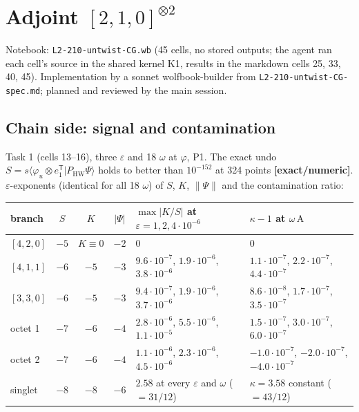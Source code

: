 \documentclass[10pt]{article}
\newcommand{\nb}[1]{\texttt{#1}}
\begin{document}
\section{Adjoint $[2,1,0]^{\otimes2}$}\label{sec:adj}

Notebook: \nb{L2-\allowbreak{}210-\allowbreak{}untwist-\allowbreak{}CG.\allowbreak{}wb} (45 cells, no stored outputs; the agent ran each cell's source in the shared kernel K1, results in the markdown cells 25, 33, 40, 45). Implementation by a sonnet wolfbook-builder from \nb{L2-\allowbreak{}210-\allowbreak{}untwist-\allowbreak{}CG-\allowbreak{}spec.\allowbreak{}md}; planned and reviewed by the main session.

\subsection{Chain side: signal and contamination}\label{sec:adjchain}

Task 1 (cells 13--16), three $\varepsilon$ and 18 $\omega$ at $\varphi$, P1. The exact undo $S=s\langle\varphi_u\otimes e_1^{\mathsf T}|P_{\mathrm{HW}}\Psi\rangle$ holds to better than $10^{-152}$ at 324 points \textbf{[exact/numeric]}. $\varepsilon$-exponents (identical for all 18 $\omega$) of $S$, $K$, $\|\Psi\|$ and the contamination ratio:

\begin{center}\footnotesize\setlength{\tabcolsep}{3pt}\begin{longtable}{@{}p{1.6cm}cccp{4.6cm}p{4.6cm}@{}}\toprule
\textbf{branch} & \textbf{$S$} & \textbf{$K$} & \textbf{$|\Psi|$} & \textbf{$\max\lvert K/S\rvert$ at $\varepsilon=1,2,4\cdot10^{-6}$} & \textbf{$\kappa-1$ at $\omega\,\mathrm{A}$} \\\midrule\endhead
$[4,2,0]$ & $-5$ & $K\equiv0$ & $-2$ & 0 & 0 \\
$[4,1,1]$ & $-6$ & $-5$ & $-3$ & $9.6\cdot10^{-7}$, $1.9\cdot10^{-6}$, $3.8\cdot10^{-6}$ & $1.1\cdot10^{-7}$, $2.2\cdot10^{-7}$, $4.4\cdot10^{-7}$ \\
$[3,3,0]$ & $-6$ & $-5$ & $-3$ & $9.4\cdot10^{-7}$, $1.9\cdot10^{-6}$, $3.7\cdot10^{-6}$ & $8.6\cdot10^{-8}$, $1.7\cdot10^{-7}$, $3.5\cdot10^{-7}$ \\
octet 1 & $-7$ & $-6$ & $-4$ & $2.8\cdot10^{-6}$, $5.5\cdot10^{-6}$, $1.1\cdot10^{-5}$ & $1.5\cdot10^{-7}$, $3.0\cdot10^{-7}$, $6.0\cdot10^{-7}$ \\
octet 2 & $-7$ & $-6$ & $-4$ & $1.1\cdot10^{-6}$, $2.3\cdot10^{-6}$, $4.5\cdot10^{-6}$ & $-1.0\cdot10^{-7}$, $-2.0\cdot10^{-7}$, $-4.0\cdot10^{-7}$ \\
singlet & $-8$ & $-8$ & $-6$ & $2.58$ at every $\varepsilon$ and $\omega$ ($=31/12$) & $\kappa=3.58$ constant ($=43/12$) \\
\bottomrule\end{longtable}\end{center}
\end{document}

